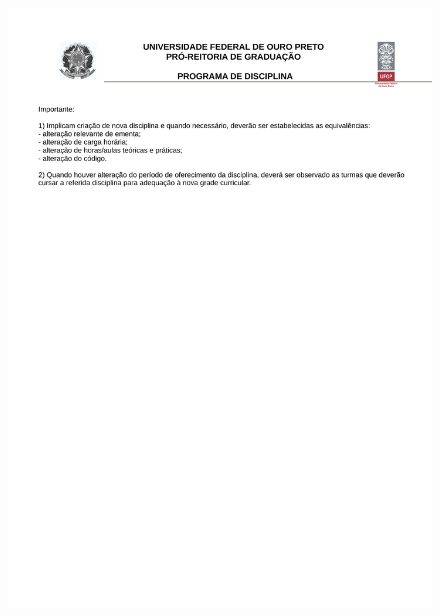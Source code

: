 \begin{figure}[p]
	\centering 
	\includegraphics[scale=0.7]{capitulos/modelo-programa/pdp3.pdf}
\end{figure}